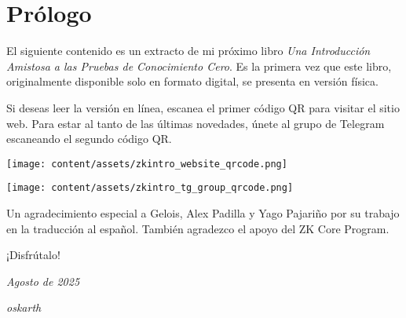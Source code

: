 \section*{Prólogo}
\setlength{\parskip}{0.25em}
\vspace{0.4cm}

El siguiente contenido es un extracto de mi próximo libro \textit{Una Introducción Amistosa a las Pruebas de Conocimiento Cero}.
Es la primera vez que este libro, originalmente disponible solo en formato digital, se presenta en versión física.

Si deseas leer la versión en línea, escanea el primer código QR para visitar el sitio web.
Para estar al tanto de las últimas novedades, únete al grupo de Telegram escaneando el segundo código QR.

\vspace{0.20cm}
\begin{center}
\texttt{[image: content/assets/zkintro\_website\_qrcode.png]}
\end{center}
\vspace{0.15cm}
\begin{center}
\texttt{[image: content/assets/zkintro\_tg\_group\_qrcode.png]}
\end{center}
\vspace{0.15cm}

Un agradecimiento especial a Gelois, Alex Padilla y Yago Pajariño por su trabajo en la traducción al español.
También agradezco el apoyo del ZK Core Program.

\vspace{0.3cm}
¡Disfrútalo!

\textit{Agosto de 2025}

\textit{oskarth}

\thispagestyle{empty}
